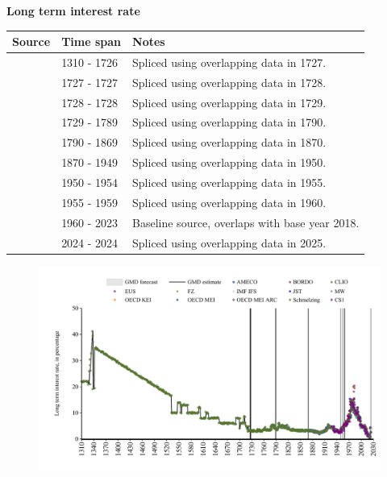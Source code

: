 \documentclass[12pt,a4paper,landscape]{article}
\begin{document}
\begin{adjustbox}{max totalsize={\paperwidth}{\paperheight},center}
\begin{minipage}[t][\textheight][t]{\textwidth}
\vspace*{0.5cm}
{}
\begin{center}
{\Large\bfseries Long term interest rate}
\end{center}
\vspace{0.5cm}
\begin{table}[H]
\centering
\small
\begin{tabular}{|l|l|l|}
\hline
\textbf{Source} & \textbf{Time span} & \textbf{Notes} \\
\hline
\rowcolor{white}\cite{Schmelzing}& 1310 - 1726 &Spliced using overlapping data in 1727. \\
\rowcolor{lightgray}\cite{CLIO}& 1727 - 1727 &Spliced using overlapping data in 1728. \\
\rowcolor{white}\cite{Schmelzing}& 1728 - 1728 &Spliced using overlapping data in 1729. \\
\rowcolor{lightgray}\cite{CLIO}& 1729 - 1789 &Spliced using overlapping data in 1790. \\
\rowcolor{white}\cite{MW}& 1790 - 1869 &Spliced using overlapping data in 1870. \\
\rowcolor{lightgray}\cite{JST}& 1870 - 1949 &Spliced using overlapping data in 1950. \\
\rowcolor{white}\cite{IMF_IFS}& 1950 - 1954 &Spliced using overlapping data in 1955. \\
\rowcolor{lightgray}\cite{OECD_MEI_ARC}& 1955 - 1959 &Spliced using overlapping data in 1960. \\
\rowcolor{white}\cite{OECD_MEI}& 1960 - 2023 &Baseline source, overlaps with base year 2018. \\
\rowcolor{lightgray}\cite{EUS}& 2024 - 2024 &Spliced using overlapping data in 2025. \\
\hline
\end{tabular}
\end{table}
\begin{figure}[H]
\centering
\includegraphics[width=\textwidth,height=0.6\textheight,keepaspectratio]{graphs/GBR_ltrate.pdf}
\end{figure}
\end{minipage}
\end{adjustbox}
\end{document}
